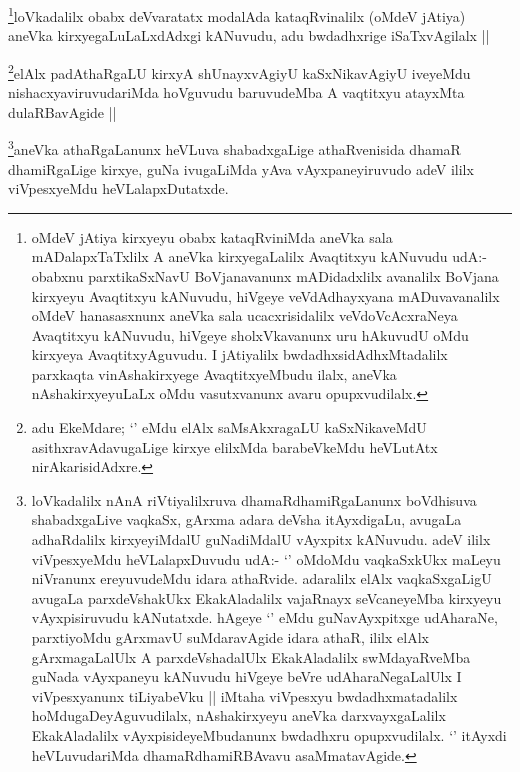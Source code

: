 \begin{artha}
\footnote{oMdeV jAtiya kirxyeyu obabx kataqRviniMda aneVka sala mADalapxTaTxlilx A aneVka kirxyegaLalilx Avaqtitxyu kANuvudu udA:- obabxnu parxtikaSxNavU BoVjanavanunx mADidadxlilx avanalilx BoVjana kirxyeyu Avaqtitxyu kANuvudu, hiVgeye veVdAdhayxyana mADuvavanalilx oMdeV hanasasxnunx aneVka sala ucacxrisidalilx veVdoVcAcxraNeya Avaqtitxyu kANuvudu, hiVgeye sholxVkavanunx uru hAkuvudU oMdu kirxyeya AvaqtitxyAguvudu. I jAtiyalilx bwdadhxsidAdhxMtadalilx parxkaqta vinAshakirxyege AvaqtitxyeMbudu ilalx, aneVka nAshakirxyeyuLaLx oMdu vasutxvanunx avaru opupxvudilalx.}loVkadalilx obabx deVvaratatx modalAda kataqRvinalilx (oMdeV jAtiya) aneVka kirxyegaLuLaLxdAdxgi kANuvudu, adu bwdadhxrige iSaTxvAgilalx ||
\end{artha}

\begin{artha}
\footnote{adu EkeMdare; `\stext' eMdu elAlx saMsAkxragaLU kaSxNikaveMdU asithxravAdavugaLige kirxye elilxMda barabeVkeMdu heVLutAtx nirAkarisidAdxre.}elAlx padAthaRgaLU kirxyA shUnayxvAgiyU kaSxNikavAgiyU iveyeMdu nishacxyaviruvudariMda hoVguvudu baruvudeMba A vaqtitxyu atayxMta dulaRBavAgide ||
\end{artha}

\begin{artha}
\footnote{loVkadalilx nAnA riVtiyalilxruva dhamaRdhamiRgaLanunx boVdhisuva shabadxgaLive vaqkaSx, gArxma adara deVsha itAyxdigaLu, avugaLa adhaRdalilx kirxyeyiMdalU guNadiMdalU vAyxpitx kANuvudu. adeV ililx viVpesxyeMdu heVLalapxDuvudu udA:- `\stext' oMdoMdu vaqkaSxkUkx maLeyu niVranunx ereyuvudeMdu idara athaRvide. adaralilx elAlx vaqkaSxgaLigU avugaLa parxdeVshakUkx EkakAladalilx vajaRnayx seVcaneyeMba kirxyeyu vAyxpisiruvudu kANutatxde. hAgeye `\stext' eMdu guNavAyxpitxge udAharaNe, parxtiyoMdu gArxmavU suMdaravAgide idara athaR, ililx elAlx gArxmagaLalUlx A parxdeVshadalUlx EkakAladalilx swMdayaRveMba guNada vAyxpaneyu kANuvudu hiVgeye beVre udAharaNegaLalUlx I viVpesxyanunx tiLiyabeVku || iMtaha viVpesxyu bwdadhxmatadalilx hoMdugaDeyAguvudilalx, nAshakirxyeyu aneVka darxvayxgaLalilx EkakAladalilx vAyxpisideyeMbudanunx bwdadhxru opupxvudilalx. `\stext' itAyxdi heVLuvudariMda dhamaRdhamiRBAvavu asaMmatavAgide.}aneVka athaRgaLanunx heVLuva shabadxgaLige athaRvenisida dhamaR dhamiRgaLige kirxye, guNa ivugaLiMda yAva vAyxpaneyiruvudo adeV ililx viVpesxyeMdu heVLalapxDutatxde.
\end{artha}

